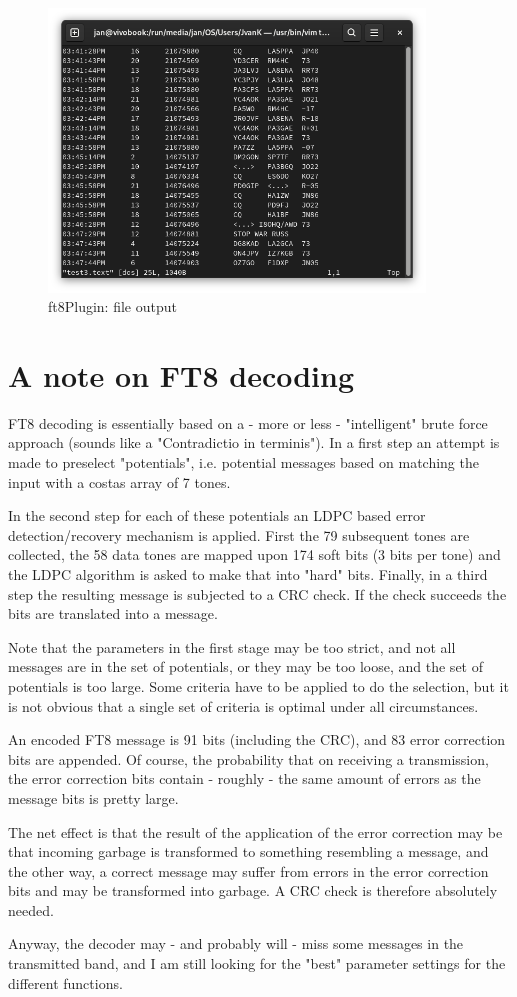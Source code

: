 \documentclass[11pt]{article}
\begin{document}
\begin{figure}[htp]
\centering
\includegraphics[width=100mm]{ft8-file.png}
\caption{ft8Plugin: file output}
\label{figure:ft8_file}
\end{figure}
\section{A note on FT8 decoding}

FT8 decoding is essentially based on a - more or less - "intelligent"
brute force approach (sounds like a "Contradictio in terminis").
In a first step an attempt is made to preselect 
"potentials", i.e. potential messages based on matching the
input with a costas array of 7 tones.
\par
In the second step for each of these potentials an LDPC based
error detection/recovery mechanism is applied. First the 79 subsequent
tones are collected, the 58 data tones are mapped upon 174
soft bits (3 bits per tone) and the LDPC algorithm is asked
to make that into "hard" bits.
Finally, in a third step the resulting message is subjected to
a CRC check.
If the check succeeds the bits are translated into a message.
\par
Note that the parameters in the first stage may be too strict,
and not all messages are in the set of potentials, or they may be too loose,
and the set of potentials is too large. Some criteria have to be applied to
do the selection, but it is not obvious that a single set of criteria
is optimal under all circumstances.
\par
An encoded FT8 message is 91 bits (including the CRC),
and 83 error correction bits are appended.
Of course, the probability that on receiving a transmission, the 
error correction bits contain - roughly - the same amount of errors
as the message bits is pretty large.
\par
The net effect is that the result of the application of the error correction
may be that incoming garbage is transformed to something resembling a
message, and the other way, a correct message may suffer from
errors in the error correction bits and may be transformed into
garbage. A CRC check is therefore absolutely needed.
\par
Anyway, the decoder may - and probably will - miss some messages
in the transmitted band,
and I am still looking for the "best" parameter settings for the
different functions.
\end{document}
